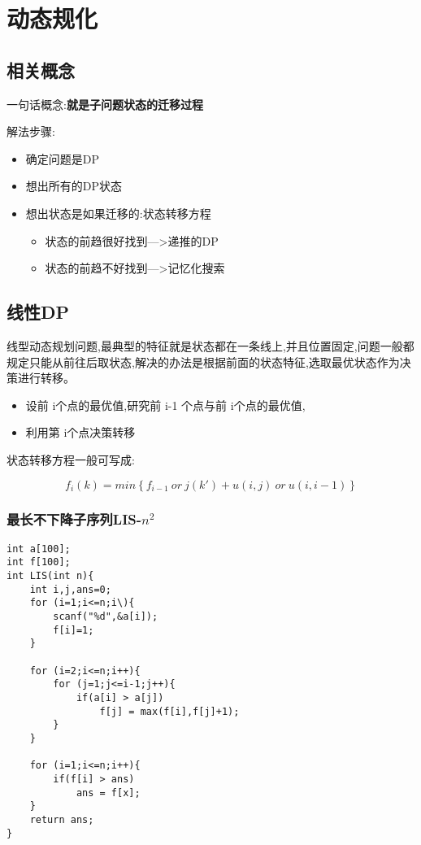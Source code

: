 \section{动态规化}

\subsection{相关概念}

一句话概念:\textbf{就是子问题状态的迁移过程}

解法步骤:

\begin{itemize}
 \item 确定问题是DP
 \item 想出所有的DP状态
 \item 想出状态是如果迁移的:状态转移方程
 \begin{itemize}
 \item 状态的前趋很好找到--->递推的DP
 \item 状态的前趋不好找到--->记忆化搜索
 \end{itemize}
\end{itemize}

\subsection{线性DP}

线型动态规划问题,最典型的特征就是状态都在一条线上,并且位置固定,问题一般都规定只能从前往后取状态,解决的办法是根据前面的状态特征,选取最优状态作为决策进行转移。 
\begin{itemize}
  \item 设前 i个点的最优值,研究前 i-1 个点与前 i个点的最优值, 
  \item 利用第 i个点决策转移 
\end{itemize}

状态转移方程一般可写成:

$$
f_i(k) = min\left \{ f_{i-1}\ or\ j( k') + u(i,j)\ or\ u(i,i-1) \right \} 
$$

\subsubsection{最长不下降子序列LIS-$n^2$}

\begin{lstlisting}
int a[100];
int f[100];
int LIS(int n){
    int i,j,ans=0;
    for (i=1;i<=n;i\){
        scanf("%d",&a[i]);
        f[i]=1;
    }
    
    for (i=2;i<=n;i++){
        for (j=1;j<=i-1;j++){
            if(a[i] > a[j])
                f[j] = max(f[i],f[j]+1);
        }
    }

    for (i=1;i<=n;i++){
        if(f[i] > ans)
            ans = f[x];
    }
    return ans;
}
\end{lstlisting}



